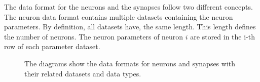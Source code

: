 The data format for the neurons and the synapses follow two different concepts.
The neuron data format contains multiple datasets containing the neuron parameters.
By definition, all datasets have, the same length. This length defines the number of neurons.
The neuron parameters of neuron $i$ are stored in the i-th row of each parameter dataset.
\begin{figure}[ht!]
   	\begin{center}
        \hspace{1cm}
    	   \end{center}
    	\caption{%
        The diagrams show the data formats for neurons and synapses with their related datasets and data types.
     }%
   \label{fig:atlas}
   \end{figure}
   
